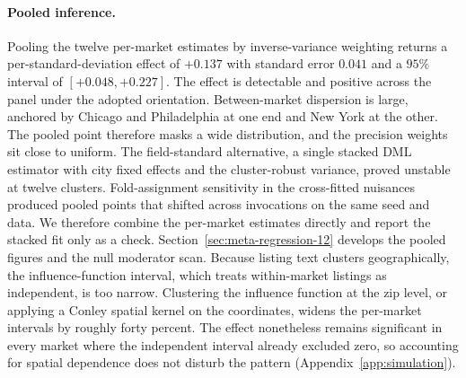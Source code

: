 \paragraph{Pooled inference.} Pooling the twelve per-market estimates by
inverse-variance weighting returns a per-standard-deviation effect of $+0.137$ with
standard error $0.041$ and a $95\%$ interval of $[+0.048, +0.227]$. The effect is detectable and
positive across the panel under the adopted orientation. Between-market dispersion
is large, anchored by Chicago and Philadelphia at one end and New York at the other.
The pooled point therefore masks a wide distribution, and the precision weights sit close to
uniform. The field-standard alternative, a single stacked DML estimator with city
fixed effects and the \citet{chiang2022multiway} cluster-robust variance, proved
unstable at twelve clusters. Fold-assignment sensitivity in the cross-fitted
nuisances produced pooled points that shifted across invocations on the same seed and
data. We therefore combine the per-market estimates directly and report the stacked fit
only as a check. Section~\ref{sec:meta-regression-12} develops the pooled figures
and the null moderator scan. Because listing text clusters geographically, the
influence-function interval, which treats within-market listings as independent, is
too narrow. Clustering the influence function at the zip level, or applying a Conley
spatial kernel on the coordinates, widens the per-market intervals by roughly forty
percent. The effect nonetheless remains significant in every market where the
independent interval already excluded zero, so accounting for spatial dependence does
not disturb the pattern (Appendix~\ref{app:simulation}).

